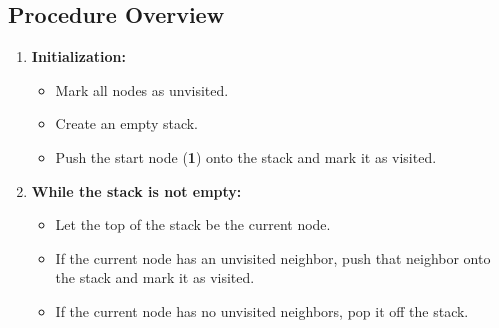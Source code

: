 \documentclass[11pt]{article}
\begin{document}
\subsection*{Procedure Overview}
\begin{enumerate}
    \item \textbf{Initialization:}
          \begin{itemize}
              \item Mark all nodes as unvisited.
              \item Create an empty stack.
              \item Push the start node (\textbf{1}) onto the stack and mark it as visited.
          \end{itemize}
    \item \textbf{While the stack is not empty:}
          \begin{itemize}
              \item Let the top of the stack be the current node.
              \item If the current node has an unvisited neighbor, push that neighbor onto the stack and mark it as visited.
              \item If the current node has no unvisited neighbors, pop it off the stack.
          \end{itemize}
\end{enumerate}
\end{document}

